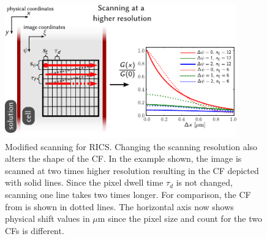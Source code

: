 \begin{figure}
  \centering
    \includegraphics[width=10cm]{figures/rics_theory_5.pdf}
    \caption[Extended \acs{RICS}: changing scanning resolution]{
    Modified scanning for \acs{RICS}. Changing the
    scanning resolution also alters the shape of the \ac{CF}. In the example
    shown, the image is scanned at two times higher resolution resulting
    in the \ac{CF} depicted with solid lines. Since the pixel dwell time
    $\tau_d$ is not changed, scanning one line takes two times longer. For comparison, the \ac{CF} from
    \F{~\ref{fig:rics_theory2}} is shown in dotted lines. The horizontal
    axis now shows physical shift values in $\mu$m since the pixel size and count
    for the two \acp{CF} is different.
    }
  \label{fig:rics_theory4}
\end{figure}

